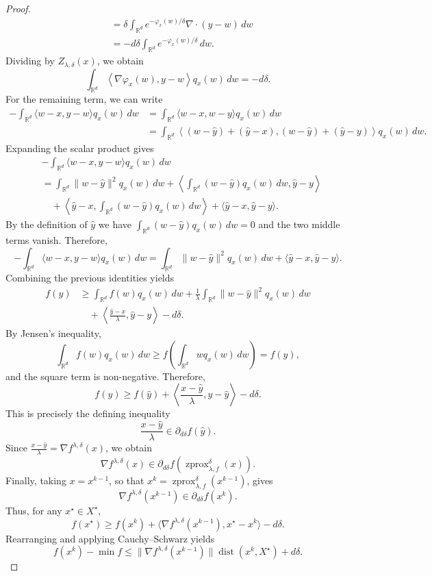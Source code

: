 \documentclass{article}
\newcommand{\zprox}{\ensuremath{\operatorname{zprox}}}
\begin{document}
\begin{proof}
\[\begin{aligned}
& =
\delta
\int_{\mathbb{R}^d}
e^{-\varphi_x(w)/\delta}
\nabla\cdot(y-w)\,dw \\
& =
-d\delta
\int_{\mathbb{R}^d}
e^{-\varphi_x(w)/\delta}\,dw .
\end{aligned}
\]
Dividing by \(Z_{\lambda,\delta}(x)\), we obtain
\[
\int_{\mathbb{R}^d}
\left\langle \nabla \varphi_x(w), y-w \right\rangle
q_x(w)\,dw
=
-d\delta.
\]
For the remaining term, we can write
\[
\begin{aligned}
-\int_{\mathbb{R}^d}
\langle w-x,y-w\rangle q_x(w)\,dw &=
\int_{\mathbb{R}^d}
\langle w-x,w-y\rangle q_x(w)\,dw \\
& =
\int_{\mathbb{R}^d}
\left\langle
(w-\hat y)+(\hat y-x),
(w-\hat y)+(\hat y-y)
\right\rangle q_x(w)\,dw .
\end{aligned}
\]
Expanding the scalar product gives
\[
\begin{aligned}
&-\int_{\mathbb{R}^d}
\langle w-x,y-w\rangle q_x(w)\,dw \\
&=
\int_{\mathbb{R}^d}\|w-\hat y\|^2q_x(w)\,dw
+
\left\langle
\int_{\mathbb{R}^d}(w-\hat y)q_x(w)\,dw,
\hat y-y
\right\rangle \\
&\quad+
\left\langle
\hat y-x,
\int_{\mathbb{R}^d}(w-\hat y)q_x(w)\,dw
\right\rangle
+
\langle \hat y-x,\hat y-y\rangle .
\end{aligned}
\]
By the definition of \(\hat y\) we have \(\int_{\mathbb{R}^d}(w-\hat y)q_x(w)\,dw=0\) and the two middle terms vanish. Therefore,
\[
-\int_{\mathbb{R}^d}
\langle w-x,y-w\rangle q_x(w)\,dw
=
\int_{\mathbb{R}^d}\|w-\hat y\|^2q_x(w)\,dw
+
\langle \hat y-x,\hat y-y\rangle .
\]
Combining the previous identities yields \[ \begin{aligned} f(y) &\ge \int_{\mathbb{R}^d} f(w)q_x(w)\,dw + \frac{1}{\lambda} \int_{\mathbb{R}^d}\|w-\hat y\|^2 q_x(w)\,dw \\ &\quad + \left\langle \frac{\hat y-x}{\lambda}, \hat y-y \right\rangle - d\delta . \end{aligned} \] By Jensen's inequality, \[ \int_{\mathbb{R}^d} f(w)q_x(w)\,dw \ge f\left(\int_{\mathbb{R}^d} wq_x(w)\,dw\right) = f(\hat y), \] and the square term is non-negative. Therefore, \[ f(y) \ge f(\hat y) + \left\langle \frac{x-\hat y}{\lambda}, y-\hat y \right\rangle - d\delta . \] This is precisely the defining inequality \[ \frac{x-\hat y}{\lambda} \in \partial_{d\delta}f(\hat y). \] Since $ \frac{x-\hat y}{\lambda} = \nabla f^{\lambda,\delta}(x)$, we obtain \[ \nabla f^{\lambda,\delta}(x) \in \partial_{d\delta}f(\zprox_{\lambda,f}^{\delta}(x)). \] Finally, taking \(x=x^{k-1}\), so that \(x^k=\zprox_{\lambda,f}^{\delta}(x^{k-1})\), gives \[ \nabla f^{\lambda,\delta}(x^{k-1}) \in \partial_{d\delta}f(x^k). \] Thus, for any \(x^\star\in X^\star\), \[ f(x^\star) \ge f(x^k) + \langle \nabla f^{\lambda,\delta}(x^{k-1}), x^\star-x^k \rangle - d\delta . \] Rearranging and applying Cauchy--Schwarz yields \[ f(x^k)-\min f \le \|\nabla f^{\lambda,\delta}(x^{k-1})\| \operatorname{dist}(x^k,X^\star) + d\delta . \] \end{proof}
\end{document}
